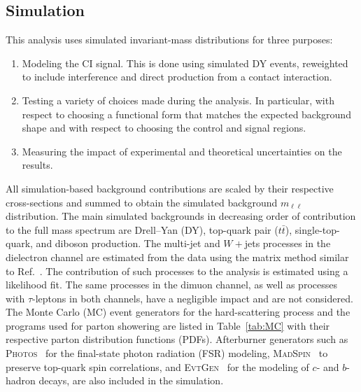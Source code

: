 \subsection{Simulation}

This analysis uses simulated invariant-mass distributions for three purposes:
\begin{enumerate}
    \item Modeling the CI signal. This is done using simulated DY events, reweighted to include interference and direct production from a contact interaction.
    \item Testing a variety of choices made during the analysis. In particular, with respect to choosing a functional form that matches the expected background shape and with respect to choosing the control and signal regions.
    \item Measuring the impact of experimental and theoretical uncertainties on the results.
\end{enumerate}

All simulation-based background contributions are scaled by their respective cross-sections and summed to obtain the simulated background $m_{\ell\ell}$ distribution.
The main simulated backgrounds in decreasing order of contribution to the full mass spectrum are Drell--Yan (DY), top-quark pair ($t\bar{t}$), single-top-quark, and diboson production.
The multi-jet and $W+$jets processes in the dielectron channel are estimated from the data using the matrix method similar to Ref.~\cite{EXOT-2016-05}. The contribution of such processes to the analysis is estimated using a likelihood fit.
The same processes in the dimuon channel, as well as processes with $\tau$-leptons in both channels, have a negligible impact and are not considered.
The Monte Carlo (MC) event generators for the hard-scattering process and the programs used for parton showering are listed in Table~\ref{tab:MC} with their respective parton distribution functions (PDFs).
Afterburner generators such as \textsc{Photos}~\cite{Golonka:2005pn} for the final-state photon radiation (FSR) modeling, \textsc{MadSpin}~\cite{Artoisenet:2012st} to preserve top-quark spin correlations, and \textsc{EvtGen}~\cite{Lange:2001uf} for the modeling of $c$- and $b$-hadron decays, are also included in the simulation.

